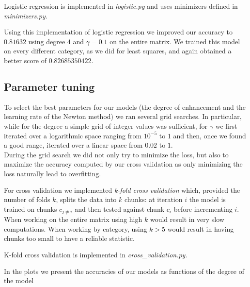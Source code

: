 \documentclass[10pt,conference,compsocconf]{IEEEtran}
\begin{document}
Logistic regression is implemented in \textit{logistic.py} and uses minimizers defined in \textit{minimizers.py}.

Using this implementation of logistic regression we improved our accuracy to $0.81632$ using degree $4$ and $\gamma = 0.1$ on the entire matrix. We trained this model on every different category, as we did for least squares, and again obtained a better score of $0.82685350422$.

\subsection{Parameter tuning}
To select the best parameters for our models (the degree of enhancement and the learning rate of the Newton method) we ran several grid searches. In particular, while for the degree a simple grid of integer values was sufficient, for $\gamma$ we first iterated over a logarithmic space ranging from $10^{-5}$ to $1$ and then, once we found a good range, iterated over a linear space from $0.02$ to $1$.\\
During the grid search we did not only try to minimize the loss, but also to maximize the accuracy computed by our cross validation as only minimizing the loss naturally lead to overfitting.

For cross validation we implemented \textit{k-fold cross validation} which, provided the number of folds $k$, splits the data into $k$ chunks: at iteration $i$ the model is trained on chunks $c_{j\neq i}$ and then tested against chunk $c_i$ before incrementing $i$. \\
When working on the entire matrix using high $k$ would result in very slow computations. When working by category, using $k>5$ would result in having chunks too small to have a reliable statistic.

K-fold cross validation is implemented in \textit{cross\_validation.py}.

In the plots we present the accuracies of our models as functions of the degree of the model
\end{document}
